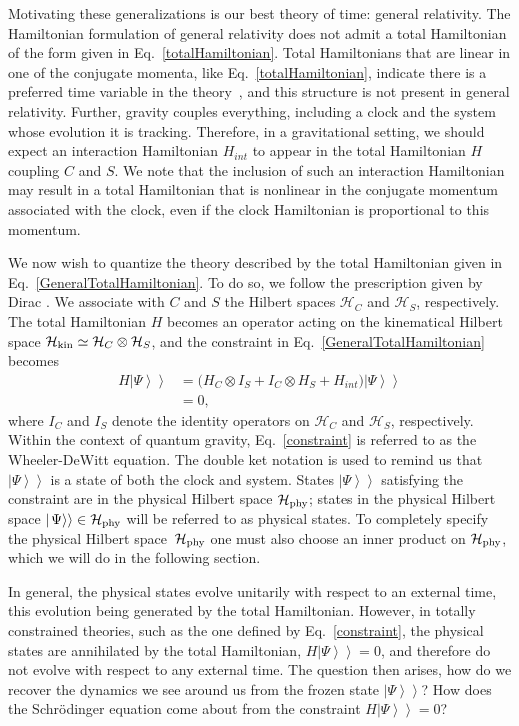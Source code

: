 \documentclass[a4paper,twocolumn,superscriptaddress,11pt,accepted=2019-06-04]{quantumarticle}
\newcommand{\kket}[1]{\left| \left. #1 \right> \right>} 		%
\newcommand{\nn}{\nonumber}		%
\begin{document}
Motivating these generalizations is our best theory of time: general relativity. The Hamiltonian formulation of general relativity does not admit a total Hamiltonian of the form given in Eq.~\eqref{totalHamiltonian}. Total Hamiltonians that are linear in one of the conjugate momenta, like Eq.~\eqref{totalHamiltonian}, indicate there is a preferred time variable in the theory~\cite{Dirac:1933}, and this structure is not present in general relativity. Further, gravity couples everything, including a clock and the system whose evolution it is tracking. Therefore, in a gravitational setting, we should expect an interaction Hamiltonian $H_{int}$ to appear in the total Hamiltonian $H$ coupling $C$ and $S$. We note that the inclusion of such an interaction Hamiltonian may result in a total Hamiltonian that is nonlinear in the conjugate momentum associated with the clock, even if the clock Hamiltonian is proportional to this momentum.




We now wish to quantize the theory described by the total Hamiltonian given in Eq.~\eqref{GeneralTotalHamiltonian}. To do so, we  follow the prescription given by Dirac \cite{Dirac:1964}.  We associate with  $C$ and  $S$ the Hilbert spaces $\mathcal{H}_C$ and $\mathcal{H}_S$, respectively. The total Hamiltonian $H$ becomes an operator acting on the kinematical Hilbert space $\mathcal{H}_{\rm kin}\simeq\mathcal{H}_C\otimes\mathcal{H}_S$, and the constraint in Eq.~\eqref{GeneralTotalHamiltonian} becomes
\begin{align}
H \kket{\Psi} &= \big(H_C \otimes I_S + I_C \otimes H_S +  H_{int} \big) \kket{\Psi}\nn \\
& =0 \label{constraint},
\end{align}
where $I_C$ and $I_S$ denote the identity operators on $\mathcal{H}_C$ and $\mathcal{H}_S$, respectively. {Within the context of quantum gravity, Eq.~\eqref{constraint} is referred to as the Wheeler-DeWitt equation.} The double ket notation is used to remind us that $\kket{\Psi}$ is a state of both the clock and system. States $\kket{\Psi}$ satisfying the constraint are in the physical Hilbert space $\mathcal{H}_{\rm phy}$; states in the physical Hilbert space $\kket{\Psi} \in \mathcal{H}_{\rm phy}$ will be referred to as physical states. To completely specify the physical Hilbert space~$\mathcal{H}_{\rm phy}$ one must also choose an inner product on $\mathcal{H}_{\rm phy}$, which we will do in the following section.

In general, the physical states evolve unitarily with respect to an external time, this evolution being generated by the total Hamiltonian. However, in totally constrained theories, such as the one defined by Eq.~\eqref{constraint}, the physical states are annihilated by the total Hamiltonian, \mbox{$H \kket{\Psi} =0$}, and therefore do not evolve with respect to any external time. The question then arises, how do we recover the dynamics we see around us from the frozen state $\kket{\Psi}$? How does the Schr\"{o}dinger equation come about from the constraint $H \kket{\Psi} =0$?
\end{document}
